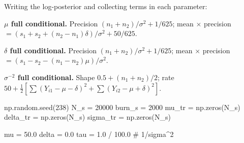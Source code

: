 \documentclass[
  letterpaper,
  DIV=11,
  numbers=noendperiod]{scrartcl}
\newenvironment{Shaded}{\begin{snugshade}}{\end{snugshade}}
\newcommand{\CommentTok}[1]{\textcolor[rgb]{0.37,0.37,0.37}{#1}}
\newcommand{\DecValTok}[1]{\textcolor[rgb]{0.68,0.00,0.00}{#1}}
\newcommand{\FloatTok}[1]{\textcolor[rgb]{0.68,0.00,0.00}{#1}}
\newcommand{\NormalTok}[1]{\textcolor[rgb]{0.00,0.23,0.31}{#1}}
\newcommand{\OperatorTok}[1]{\textcolor[rgb]{0.37,0.37,0.37}{#1}}
\begin{document}
Writing the log-posterior and collecting terms in each parameter:

\textbf{\(\mu\) full conditional.} Precision
\((n_1 + n_2)/\sigma^2 + 1/625\); mean \(\times\) precision
\(= (s_1 + s_2 + (n_2 - n_1)\delta)/\sigma^2 + 50/625\).

\textbf{\(\delta\) full conditional.} Precision
\((n_1 + n_2)/\sigma^2 + 1/625\); mean \(\times\) precision
\(= (s_1 - s_2 - (n_1 - n_2)\mu)/\sigma^2\).

\textbf{\(\sigma^{-2}\) full conditional.} Shape
\(0.5 + (n_1 + n_2)/2\); rate
\(50 + \tfrac{1}{2}\left[\sum(Y_{i1}-\mu-\delta)^2 + \sum(Y_{i2}-\mu+\delta)^2\right]\).

\begin{Shaded}
\begin{Highlighting}[]
\NormalTok{np.random.seed(}\DecValTok{238}\NormalTok{)}
\NormalTok{N\_s }\OperatorTok{=} \DecValTok{20000}
\NormalTok{burn\_s }\OperatorTok{=} \DecValTok{2000}
\NormalTok{mu\_tr    }\OperatorTok{=}\NormalTok{ np.zeros(N\_s)}
\NormalTok{delta\_tr }\OperatorTok{=}\NormalTok{ np.zeros(N\_s)}
\NormalTok{sigma\_tr }\OperatorTok{=}\NormalTok{ np.zeros(N\_s)}

\NormalTok{mu    }\OperatorTok{=} \FloatTok{50.0}
\NormalTok{delta }\OperatorTok{=} \FloatTok{0.0}
\NormalTok{tau   }\OperatorTok{=} \FloatTok{1.0} \OperatorTok{/} \FloatTok{100.0}   \CommentTok{\# 1/sigma\^{}2}


\end{Highlighting}
\end{Shaded}
\end{document}
